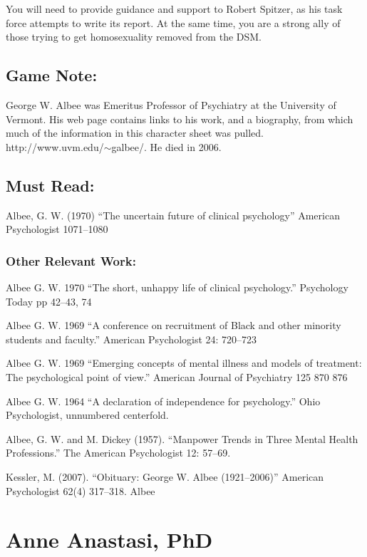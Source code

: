 You will need to provide guidance and support to Robert Spitzer, as his task force attempts to write its report. At the same time, you are a strong ally of those trying to get homosexuality removed from the DSM.

\section{Game Note:}
\label{gamenote:}

George W. Albee was Emeritus Professor of Psychiatry at the University of Vermont. His web page contains links to his work, and a biography, from which much of the information in this character sheet was pulled. http:\slash \slash www.uvm.edu\slash \ensuremath{\sim}galbee\slash . He died in 2006.

\section{Must Read:}
\label{mustread:}

Albee, G. W. (1970) ``The uncertain future of clinical psychology'' American Psychologist 1071--1080

\subsection{Other Relevant Work:}
\label{otherrelevantwork:}

Albee G. W. 1970 ``The short, unhappy life of clinical psychology.'' Psychology Today pp 42--43, 74

Albee G. W. 1969 ``A conference on recruitment of Black and other minority students and faculty.'' American Psychologist 24: 720--723

Albee G. W. 1969 ``Emerging concepts of mental illness and models of treatment: The psychological point of view.'' American Journal of Psychiatry 125 870 876

Albee G. W. 1964 ``A declaration of independence for psychology.'' Ohio Psychologist, unnumbered centerfold.

Albee, G. W. and M. Dickey (1957). ``Manpower Trends in Three Mental Health Professions.'' The American Psychologist 12: 57--69.

Kessler, M. (2007). ``Obituary: George W. Albee (1921--2006)'' American Psychologist 62(4) 317--318.
Albee

\chapter{Anne Anastasi, PhD}
\label{anneanastasiphd}

